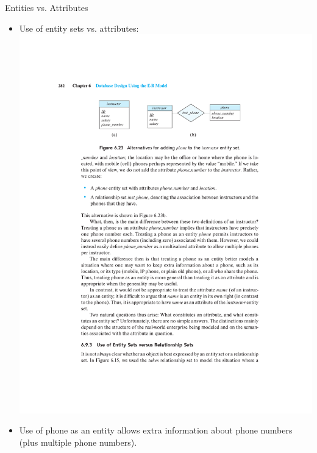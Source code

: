 \documentclass{beamer}
\begin{document}
\begin{frame}{Entities vs. Attributes}
    \begin{itemize}
        \item Use of entity sets vs. attributes:
        \includegraphics[trim={5cm 20.30cm 4cm 4.75cm}, clip, width=\textwidth]{figures/phones}
        \item Use of phone as an entity allows extra information about phone numbers (plus multiple phone numbers).
    \end{itemize}
\end{frame}
\end{document}
